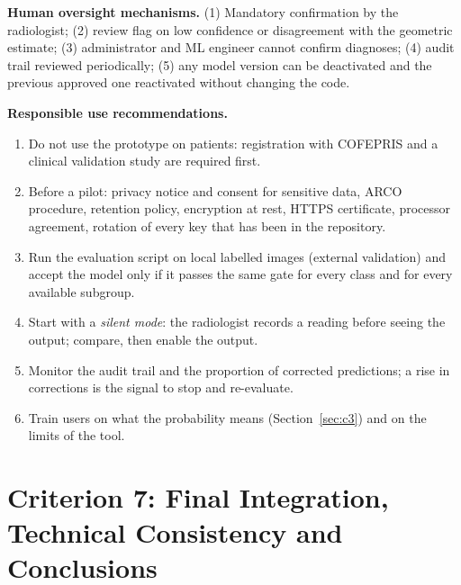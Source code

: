 \documentclass[12pt,a4paper]{article}
\begin{document}
\noindent\textbf{Human oversight mechanisms.} (1) Mandatory confirmation by the radiologist; (2) review flag on low confidence or disagreement with the geometric estimate; (3) administrator and ML engineer cannot confirm diagnoses;
(4) audit trail reviewed periodically; (5) any model version can be deactivated and the previous approved one reactivated without changing the code.

\noindent\textbf{Responsible use recommendations.}
\begin{enumerate}[leftmargin=*]
    \item Do not use the prototype on patients: registration with COFEPRIS and a clinical validation study are required first.
    \item Before a pilot: privacy notice and consent for sensitive data, ARCO procedure, retention policy, encryption at rest, HTTPS certificate, processor agreement, rotation of every key that has been in the repository.
    \item Run the evaluation script on local labelled images (external validation) and accept the model only if it passes the same gate for every class and for every available subgroup.
    \item Start with a \emph{silent mode}: the radiologist records a reading before seeing the output; compare, then enable the output.
    \item Monitor the audit trail and the proportion of corrected predictions; a rise in corrections is the signal to stop and re-evaluate.
    \item Train users on what the probability means (Section~\ref{sec:c3}) and on the limits of the tool.
\end{enumerate}

\section{Criterion 7: Final Integration, Technical Consistency and Conclusions}
\label{sec:m4c7}
\end{document}
